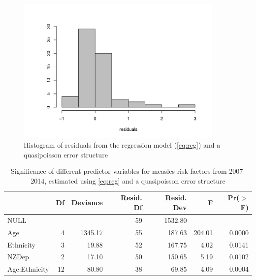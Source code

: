 \documentclass{article}
\begin{document}
\begin{figure}
\begin{center}
     \includegraphics[width=0.9\textwidth]{Cases_regmodel_resid.pdf}
\end{center}
\caption{Histogram of residuals from the regression model (\autoref{eq:reg}) and a quasipoisson error structure}
\label{fig:resid}
\end{figure}

\vspace{5mm} %
\begin{table}
\begin{tabular}{lrrrrrr}
  \hline
 & Df & Deviance & Resid. Df & Resid. Dev & F & Pr($>$F) \\ 
  \hline
NULL &  &  & 59 & 1532.80 &  &  \\ 
  Age & 4 & 1345.17 & 55 & 187.63 & 204.01 & 0.0000 \\ 
  Ethnicity & 3 & 19.88 & 52 & 167.75 & 4.02 & 0.0141 \\ 
  NZDep & 2 & 17.10 & 50 & 150.65 & 5.19 & 0.0102 \\ 
  Age:Ethnicity & 12 & 80.80 & 38 & 69.85 & 4.09 & 0.0004 \\ 
   \hline
\end{tabular}\caption{Significance of different predictor variables for measles risk factors from 2007-2014, estimated using \autoref{eq:reg} and a quasipoisson error structure}
\label{table:anova}
\end{table}
\end{document}
